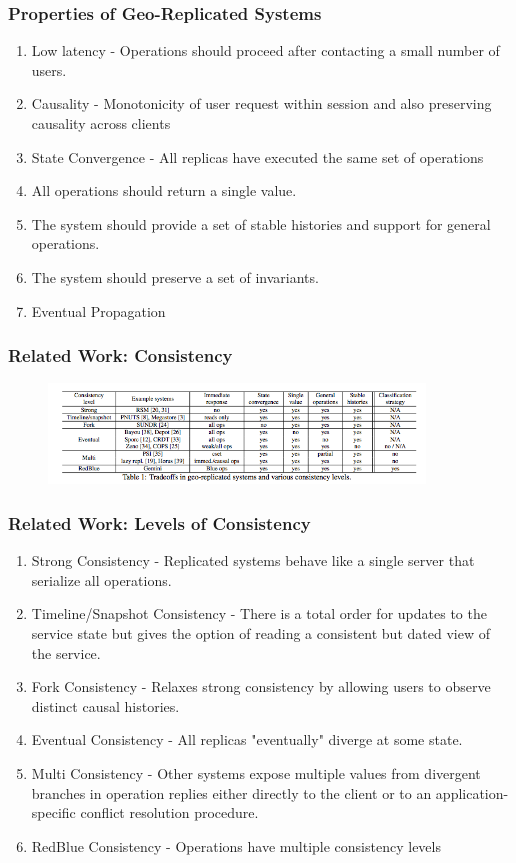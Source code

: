 \documentclass{beamer}
\begin{document}

\begin{frame}
\frametitle{Properties of Geo-Replicated Systems}
\begin{enumerate}
\item Low latency - Operations should proceed after contacting a small number of users.
\item Causality - Monotonicity of user request within session and also preserving causality across clients
\item State Convergence - All replicas have executed the same set of operations
\item All operations should return a single value.
\item The system should provide a set of stable histories and support for general operations.
\item The system should preserve a set of invariants.
\item Eventual Propagation
\end{enumerate}
\end{frame}

\begin{frame}
\frametitle{Related Work: Consistency}
\begin{figure}[t]
\includegraphics[width=10cm]{pic1.jpg}
\centering
\end{figure}
\end{frame}


\begin{frame}
\frametitle{Related Work: Levels of Consistency}
\begin{enumerate}
\item Strong Consistency - Replicated systems behave like a single server that serialize all operations.
\item Timeline/Snapshot Consistency - There is a total order for updates to the service state but gives the option of reading a consistent but dated view of the service.
\item Fork Consistency - Relaxes strong consistency by allowing users to observe distinct causal histories.
\item Eventual Consistency - All replicas "eventually" diverge at some state.
\item Multi Consistency - Other systems expose multiple values from divergent branches in operation replies either directly to the client or to an application-specific conflict resolution procedure.
\item RedBlue Consistency - Operations have multiple consistency levels
\end{enumerate}

\end{frame}
\end{document}

